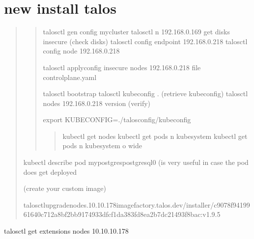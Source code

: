 \documentclass[letterpaper,10pt,english]{sphinxmanual}
\begin{document}
\section{new install talos}
\label{\detokenize{talos:new-install-talos}}
\sphinxAtStartPar
{}
\begin{quote}
\begin{quote}

\sphinxAtStartPar
talosctl gen config my\sphinxhyphen{}cluster 
talosctl \sphinxhyphen{}n 192.168.0.169 get disks \textendash{}insecure (check disks)
talosctl config endpoint 192.168.0.218
talosctl config node 192.168.0.218

\sphinxAtStartPar
talosctl apply\sphinxhyphen{}config \textendash{}insecure \textendash{}nodes 192.168.0.218 \textendash{}file controlplane.yaml

\sphinxAtStartPar
talosctl bootstrap
talosctl kubeconfig . (retrieve kubeconfig)
talosctl \textendash{}nodes 192.168.0.218 version (verify)

\sphinxAtStartPar
export KUBECONFIG=./talos\sphinxhyphen{}config/kubeconfig
\begin{quote}

\sphinxAtStartPar
kubectl get nodes
kubectl get pods \sphinxhyphen{}n kube\sphinxhyphen{}system
kubectl get pods \sphinxhyphen{}n kube\sphinxhyphen{}system \sphinxhyphen{}o wide
\end{quote}
\end{quote}

\sphinxAtStartPar
kubectl describe pod my\sphinxhyphen{}postgres\sphinxhyphen{}postgresql\sphinxhyphen{}0 (is very useful in case the pod does get deployed

\sphinxAtStartPar
{} (create your custom image)

\begin{sphinxVerbatim}[commandchars=\\\{\}]
talosctlupgrade\PYGZhy{}\PYGZhy{}nodes.10.10.178\PYGZhy{}\PYGZhy{}imagefactory.talos.dev/installer/c9078f9419961640c712a8bf2bb9174933dfcf1da383fd8ea2b7dc21493f8bac:v1.9.5
\end{sphinxVerbatim}
\end{quote}
\begin{description}
\sphinxAtStartPar
talosctl get extensions \textendash{}nodes 10.10.10.178

\end{description}
\end{document}

